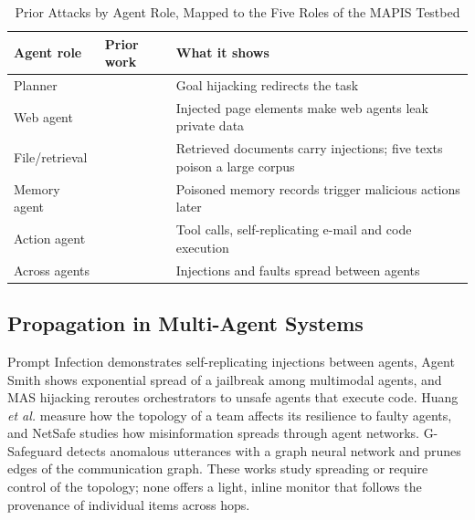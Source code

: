 \documentclass{ieeeaccess}
\begin{document}
\begin{table}[!t]
\caption{Prior Attacks by Agent Role, Mapped to the Five Roles of the MAPIS Testbed}
\label{tab:roles}
\centering\footnotesize
\begin{tabular}{L{1.75cm}L{2.15cm}L{3.75cm}}
\toprule
Agent role & Prior work & What it shows \\
\midrule
Planner & \cite{perez2022,liu2024formalizing} & Goal hijacking redirects the task \\
Web agent & \cite{liao2025eia} & Injected page elements make web agents leak private data \\
File/retrieval & \cite{greshake2023,zou2025poisonedrag} & Retrieved documents carry injections; five texts poison a large corpus \\
Memory agent & \cite{chen2024agentpoison,dong2025minja} & Poisoned memory records trigger malicious actions later \\
Action agent & \cite{zhan2024injecagent,cohen2024worm,triedman2025mas} & Tool calls, self-replicating e-mail and code execution \\
Across agents & \cite{lee2024infection,gu2024agentsmith,huang2025resilience} & Injections and faults spread between agents \\
\bottomrule
\end{tabular}
\end{table}

\subsection{Propagation in Multi-Agent Systems}
Prompt Infection \cite{lee2024infection} demonstrates self-replicating injections between agents, Agent Smith \cite{gu2024agentsmith} shows exponential spread of a jailbreak among multimodal agents, and MAS hijacking \cite{triedman2025mas} reroutes orchestrators to unsafe agents that execute code. Huang \emph{et al.} \cite{huang2025resilience} measure how the topology of a team affects its resilience to faulty agents, and NetSafe \cite{yu2025netsafe} studies how misinformation spreads through agent networks. G-Safeguard \cite{wang2025gsafeguard} detects anomalous utterances with a graph neural network and prunes edges of the communication graph. These works study spreading or require control of the topology; none offers a light, inline monitor that follows the provenance of individual items across hops.
\end{document}
